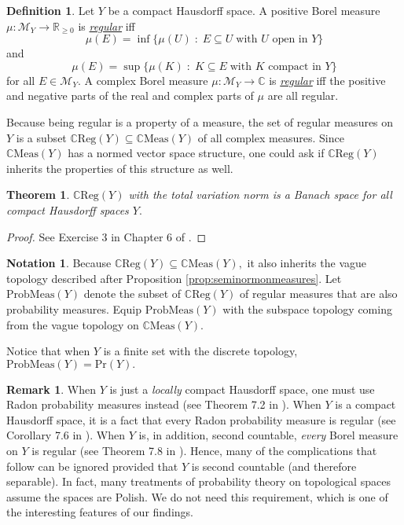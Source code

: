 \documentclass[12pt]{article}
\theoremstyle{theorem}
\newtheorem{theorem}[equation]{Theorem}
\theoremstyle{definition}
\newtheorem{definition}[equation]{Definition}
\newtheorem{remark}[equation]{Remark}
\newtheorem{notation}[equation]{Notation}
\numberwithin{equation}{section}
\let\C=\Chi \let\W=\Omega
\newcommand{\be}{\begin{equation}}
\newcommand{\ee}{\end{equation}}
\newcommand{\bt}{\begin{theorem}}
\newcommand{\et}{\end{theorem}}
\newcommand{\bd}{\begin{definition}}
\newcommand{\ed}{\end{definition}}
\newcommand{\bprf}{\begin{proof}}
\newcommand{\eprf}{\end{proof}}
\newcommand{\br}{\begin{remark}}
\newcommand{\er}{\end{remark}}
\newcommand{\<}{\langle}
\renewcommand{\>}{\rangle}
\def\R{{{\mathbb R}}}
\def\C{{{\mathbb C}}}
\begin{document}
\bd
Let $Y$ be a compact Hausdorff space. A positive Borel measure 
$\mu:\mathcal{M}_{Y}\to\R_{\ge0}$ is \emph{\uline{regular}} iff
\be
\mu(E)=\inf\big\{\mu(U)\;:\; E\subseteq U\; \text{with $U$ open in $Y$} \big\}
\ee
and
\be
\mu(E)=\sup\big\{\mu(K)\;:\; K\subseteq E\; \text{with $K$ compact in $Y$}\big\}
\ee
for all $E\in\mathcal{M}_{Y}.$ 
A complex Borel measure 
$\mu:\mathcal{M}_{Y}\to\C$ is \emph{\uline{regular}} iff the 
positive and negative parts of the real and complex parts of $\mu$ 
are all regular. 
\ed

Because being regular is a property of a measure, the set of 
regular measures on $Y$ is a subset 
$\C\mathrm{Reg}(Y)\subseteq\C\mathrm{Meas}(Y)$ of all 
complex measures. Since $\C\mathrm{Meas}(Y)$ has a normed
vector space structure, one could ask if 
$\C\mathrm{Reg}(Y)$ inherits the properties of this structure as well. 

\bt
$\C\mathrm{Reg}(Y)$ with the total variation norm 
is a Banach space for all compact Hausdorff spaces $Y.$ 
\et

\bprf
See Exercise 3 in Chapter 6 of \cite{Ru87}. 
\eprf

\begin{notation}
\label{not:ProbMeas}
Because $\C\mathrm{Reg}(Y)\subseteq\C\mathrm{Meas}(Y),$
it also inherits the vague topology described after 
Proposition \ref{prop:seminormonmeasures}. 
Let $\mathrm{ProbMeas}(Y)$ denote the subset of $\C\mathrm{Reg}(Y)$
of regular measures that are also probability measures. 
Equip $\mathrm{ProbMeas}(Y)$ with the subspace
topology coming from the vague topology on $\C\mathrm{Meas}(Y).$
\end{notation}

Notice that when $Y$ is a finite set with the discrete topology, 
$\mathrm{ProbMeas}(Y)=\mathrm{Pr}(Y).$

\br
When $Y$ is just a \emph{locally} compact Hausdorff space, 
one must use Radon probability measures instead 
(see Theorem 7.2 in \cite{Fo07}).
When $Y$ is a compact Hausdorff space, it is a fact that every
Radon probability measure is regular (see Corollary 7.6 in \cite{Fo07}).
When $Y$ is, in addition, second countable, \emph{every} Borel measure
on $Y$ is regular (see Theorem 7.8 in \cite{Fo07}). 
Hence, many of the complications that follow can be ignored provided
that $Y$ is second countable (and therefore separable). 
In fact, many treatments of probability theory on topological spaces
assume the spaces are Polish. We do not need this requirement, which
is one of the interesting features of our findings. 
\er
\end{document}
